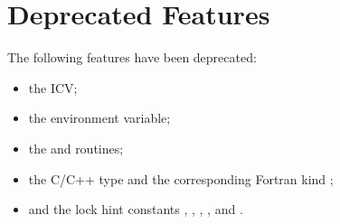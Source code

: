 \section{Deprecated Features}
\label{chap:Deprecated Features}

The following features have been deprecated:

\begin{itemize}
\item the  ICV;
\item the  environment variable;
\item the  and  routines;
\item the C/C++ type  and the corresponding Fortran kind ;
\item and the lock hint constants , , , , and .
\end{itemize}



